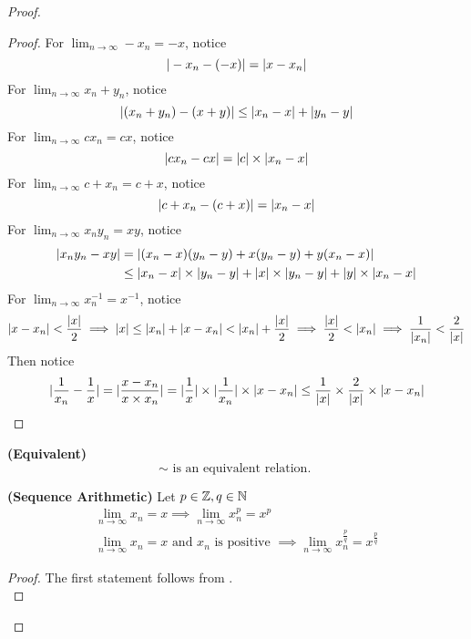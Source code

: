 \documentclass{report}
\begin{document}
\begin{proof}
\begin{proof}
For $\lim_{n\to\infty}-x_n=-x$, notice
\begin{equation}
  |-x_n-(-x)|=|x-x_n|
\end{equation}
For $\lim_{n\to\infty}x_n+y_n$, notice
\begin{equation}
|(x_n+y_n)-(x+y)|\leq |x_n-x|+|y_n-y|
\end{equation}
For $\lim_{n\to\infty} cx_n=cx$, notice
\begin{equation}
|cx_n-cx|=|c|\times|x_n-x|
\end{equation}
For $\lim_{n\to\infty} c+x_n=c+x$, notice
\begin{equation}
|c+x_n-(c+x)|=|x_n-x|
\end{equation}
For $\lim_{n\to\infty} x_ny_n=xy$, notice
\begin{align}
  |x_ny_n-xy|&=|(x_n-x)(y_n-y)+x(y_n-y)+y(x_n-x)|\\
  &\leq |x_n-x|\times|y_n-y|+|x|\times|y_n-y|+|y|\times|x_n-x|
\end{align}
For $\lim_{n\to\infty}x_n^{-1}=x^{-1}$, notice 
\begin{equation}
\abso{x-x_n}<\frac{\abso{x}}{2}\implies \abso{x}\leq \abso{x_n}+\abso{x-x_n}<\abso{x_n}+\frac{\abso{x}}{2}\implies \frac{\abso{x}}{2}<\abso{x_n}\implies \frac{1}{\abso{x_n}}<\frac{2}{\abso{x}}
\end{equation}
Then notice
\begin{equation}
|\frac{1}{x_n}-\frac{1}{x}|=|\frac{x-x_n}{x\times x_n}|=|\frac{1}{x}|\times |\frac{1}{x_n}|\times |x-x_n|\leq \frac{1}{|x|}\times \frac{2}{|x|}\times |x-x_n|
\end{equation}
\end{proof}
\begin{corollary}
\label{4.1.7}
\textbf{(Equivalent)} 
\begin{equation}
\sim\text{ is an equivalent relation. }
\end{equation}
\end{corollary}
\begin{corollary}
\label{4.1.8}
\textbf{(Sequence Arithmetic)} Let $p\in\mathbb{Z},q\in\mathbb{N}$
\begin{gather}
\lim_{n\to\infty} x_n=x\implies \lim_{n\to\infty} x_n^p=x^p\\
\lim_{n\to\infty} x_n=x\text{ and }x_n\text{ is positive }\implies \lim_{n\to\infty} x_n^{\frac{p}{q}}=x^{\frac{p}{q}}
\end{gather}
\end{corollary}
\begin{proof}
The first statement follows from .\\


\end{proof}
\end{proof}
\end{document}

